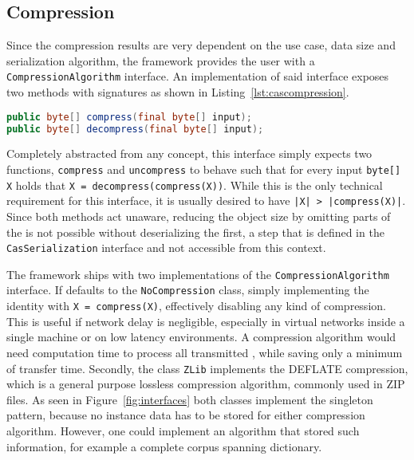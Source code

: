 \subsection{Compression}
Since the compression results are very dependent on the use case, data size and serialization algorithm, the framework provides the user with a \lstinline|CompressionAlgorithm| interface. An implementation of said interface exposes two methods with signatures as shown in Listing~\ref{lst:cascompression}.
\begin{lstlisting}[language=Java,caption={CompressionAlgorithm method signatures},label=lst:cascompression]
public byte[] compress(final byte[] input);
public byte[] decompress(final byte[] input);
\end{lstlisting}
Completely abstracted from any \uima{} concept, this interface simply expects two functions, \lstinline|compress| and \lstinline|uncompress| to behave such that for every input \lstinline|byte[] X| holds that \lstinline|X = decompress(compress(X))|. While this is the only technical requirement for this interface, it is usually desired to have \lstinline+|X| > |compress(X)|+. Since both methods act \uima{} unaware, reducing the object size by omitting parts of the \cas{} is not possible without deserializing the \cas{} first, a step that is defined in the \lstinline|CasSerialization| interface and not accessible from this context. 

The framework ships with two implementations of the \lstinline|CompressionAlgorithm| interface. If defaults to the \lstinline|NoCompression| class, simply implementing the identity with \lstinline|X = compress(X)|, effectively disabling any kind of compression. This is useful if network delay is negligible, especially in virtual networks inside a single machine or on low latency environments. A compression algorithm would need computation time to process all transmitted \cas{}, while saving only a minimum of transfer time. Secondly, the class \lstinline|ZLib| implements the DEFLATE compression, which is a general purpose lossless compression algorithm, commonly used in ZIP files. As seen in Figure~\ref{fig:interfaces} both classes implement the singleton pattern, because no instance data has to be stored for either compression algorithm. However, one could implement an algorithm that stored such information, for example a complete corpus spanning dictionary.

